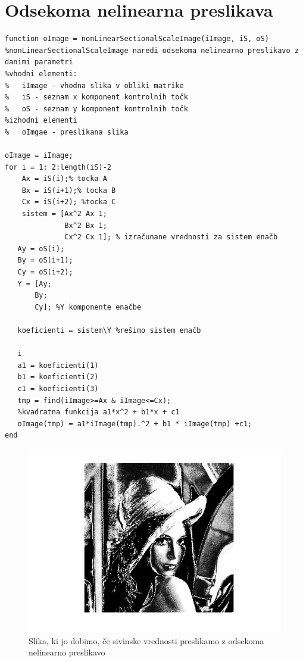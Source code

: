 \documentclass[12pt,a4paper]{article}
\begin{document}
\section{Odsekoma nelinearna preslikava}
\begin{verbatim}
function oImage = nonLinearSectionalScaleImage(iImage, iS, oS)
%nonLinearSectionalScaleImage naredi odsekoma nelinearno preslikavo z danimi parametri
%vhodni elementi:
%   iImage - vhodna slika v obliki matrike
%   iS - seznam x komponent kontrolnih točk
%   oS - seznam y komponent kontrolnih točk
%izhodni elementi
%   oImgae - preslikana slika

oImage = iImage;
for i = 1: 2:length(iS)-2
    Ax = iS(i);% tocka A
    Bx = iS(i+1);% tocka B
    Cx = iS(i+2); %tocka C
    sistem = [Ax^2 Ax 1;
              Bx^2 Bx 1;
              Cx^2 Cx 1]; % izračunane vrednosti za sistem enačb
   Ay = oS(i);
   By = oS(i+1);
   Cy = oS(i+2);
   Y = [Ay;
       By;
       Cy]; %Y komponente enačbe
   
   koeficienti = sistem\Y %rešimo sistem enačb
   
   i
   a1 = koeficienti(1)
   b1 = koeficienti(2)
   c1 = koeficienti(3)
   tmp = find(iImage>=Ax & iImage<=Cx);
   %kvadratna funkcija a1*x^2 + b1*x + c1
   oImage(tmp) = a1*iImage(tmp).^2 + b1 * iImage(tmp) +c1;
end
\end{verbatim}
\pagebreak
\begin{figure}
  \begin{center}
    \includegraphics[scale = 0.7]{cetrta.jpg}
    \caption{Slika, ki jo dobimo, če sivinske vrednosti preslikamo z odsekoma nelinearno preslikavo}
    \label{fig:}
  \end{center}
\end{figure}
\end{document}
